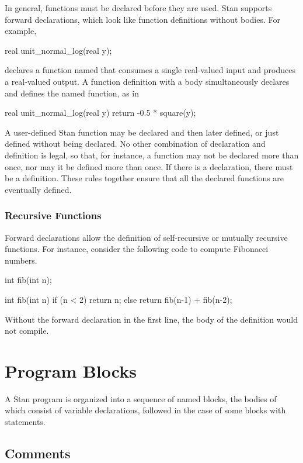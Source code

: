 In general, functions must be declared before they are used.  Stan
supports forward declarations, which look like function definitions
without bodies.  For example,
%
\begin{stancode}
real unit_normal_log(real y);
\end{stancode}
%
declares a function named  that consumes a
single real-valued input and produces a real-valued output.  A
function definition with a body simultaneously declares and defines
the named function, as in
%
\begin{stancode}
real unit_normal_log(real y) {
  return -0.5 * square(y);
}
\end{stancode}
%

A user-defined Stan function may be declared and then later defined,
or just defined without being declared.  No other combination of
declaration and definition is legal, so that, for instance, a function
may not be declared more than once, nor may it be defined more than
once.  If there is a declaration, there must be a definition.  These
rules together ensure that all the declared functions are eventually
defined.

\subsection{Recursive Functions}

Forward declarations allow the definition of self-recursive or
mutually recursive functions.  For instance, consider the following
code to compute Fibonacci numbers.
%
\begin{stancode}
int fib(int n);

int fib(int n) {
  if (n < 2) return n;
  else return fib(n-1) + fib(n-2);
}
\end{stancode}
%
Without the forward declaration in the first line, the body of the
definition would not compile.




\chapter{Program Blocks}\label{blocks.chapter}

\noindent
A Stan program is organized into a sequence of named blocks, the
bodies of which consist of variable declarations, followed in the case
of some blocks with statements.

\section{Comments}\label{comments.section}

